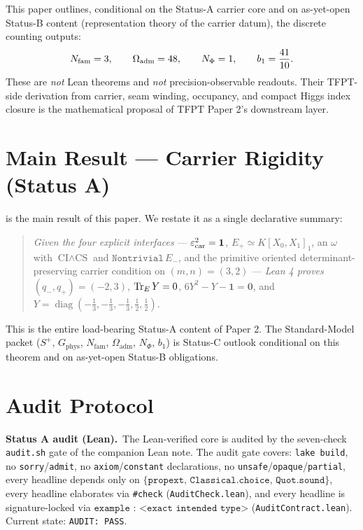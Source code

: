 \documentclass[11pt,a4paper]{article}
\begin{document}
This paper outlines, conditional on the Status-A carrier core and on as-yet-open Status-B
content (representation theory of the carrier datum), the discrete counting outputs:
\[
N_{\mathrm{fam}}=3,
\qquad
\Omega_{\mathrm{adm}}=48,
\qquad
N_\Phi=1,
\qquad
b_1=\frac{41}{10}.
\]
These are \emph{not} Lean theorems and \emph{not} precision-observable readouts. Their TFPT-side
derivation from carrier, seam winding, occupancy, and compact Higgs index closure is the
mathematical proposal of TFPT Paper 2's downstream layer.

\section{Main Result --- Carrier Rigidity (Status A)}

 is the main result of this paper. We restate it as a single
declarative summary:

\begin{quote}
\emph{Given the four explicit interfaces} --- $\varepsilon_{\mathrm{car}}^2 = \mathbf 1$,
$E_+ \simeq K[X_0, X_1]_1$, an $\omega$ with $\textrm{CI} \wedge \textrm{CS}$ and
$\texttt{Nontrivial}\,E_-$, and the primitive oriented determinant-preserving carrier condition
on $(m, n) = (3, 2)$ --- \emph{Lean 4 proves} $(q_-, q_+) = (-2, 3)$, $\operatorname{Tr}_E Y = 0$,
$6 Y^2 - Y - \mathbf 1 = \mathbf 0$, and
$Y = \operatorname{diag}(-\tfrac13,-\tfrac13,-\tfrac13,\tfrac12,\tfrac12)$.
\end{quote}

This is the entire load-bearing Status-A content of Paper 2. The Standard-Model packet
($S^+$, $G_{\mathrm{phys}}$, $N_{\mathrm{fam}}$, $\Omega_{\mathrm{adm}}$, $N_\Phi$, $b_1$) is
Status-C outlook conditional on this theorem and on as-yet-open Status-B obligations.

\section{Audit Protocol}

\noindent\textbf{Status A audit (Lean).}\ The Lean-verified core is audited by the seven-check
\texttt{audit.sh} gate of the companion Lean note. The audit gate covers: \texttt{lake build},
no \texttt{sorry}/\texttt{admit}, no \texttt{axiom}/\texttt{constant} declarations, no
\texttt{unsafe}/\texttt{opaque}/\texttt{partial}, every headline depends only on
$\{\texttt{propext},\,\texttt{Classical.choice},\,\texttt{Quot.sound}\}$, every headline
elaborates via \texttt{\#check} (\texttt{AuditCheck.lean}), and every headline is signature-locked
via $\texttt{example : <exact intended type>}$ (\texttt{AuditContract.lean}). Current state:
\texttt{AUDIT:~PASS}.
\end{document}
